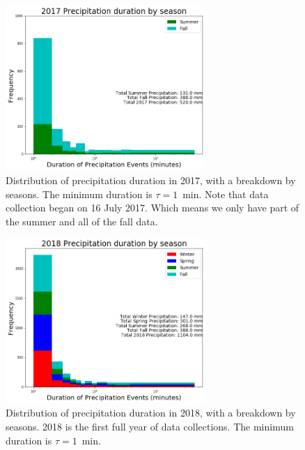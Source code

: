 \documentclass[11pt]{report}
\begin{document}
\clearpage
\begin{figure}[t]
	\centering
	\includegraphics[width=0.675\textwidth]{Figures/precip_2017.png}
	\caption[Precipitation histogram for 2017 broken down by
	season]{\label{p2017} Distribution of precipitation duration in
		2017, with a breakdown by seasons. The minimum duration is $\tau = 1$~min.  Note that data collection began on 16 July
		2017. Which means we only have part of the summer and all of the fall data.  }
\end{figure}
\begin{figure}[b]
	\centering
	\includegraphics[width=0.675\textwidth]{Figures/precip_2018.png}
	\caption[Precipitation histogram for 2018 broken down by season]{\label{p2018}
		Distribution of precipitation duration in 2018, with a breakdown
		by seasons. 2018 is the first full year of data collections. The minimum duration is $\tau = 1$~min.}
\end{figure}
\end{document}
